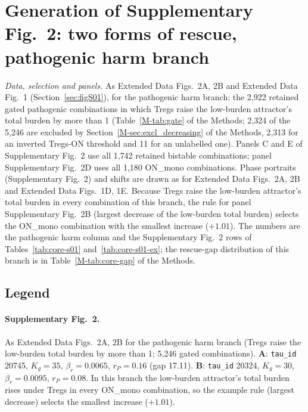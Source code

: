 \documentclass[11pt]{article}
\begin{document}
\section{Generation of Supplementary Fig.~2: two forms of rescue, pathogenic harm branch}
\label{sec:figS06}

\emph{Data, selection and panels.} As Extended Data Figs.~2A, 2B and Extended Data Fig.~1
(Section~\ref{sec:figS01}), for the pathogenic harm branch: the 2{,}922 retained gated pathogenic
combinations in which Tregs raise the low-burden attractor's total burden by more than 1
(Table~\ref{M-tab:gate} of the Methods; 2{,}324 of the 5{,}246 are excluded by
Section~\ref{M-sec:excl_decreasing} of the Methods, 2{,}313 for an inverted Tregs-ON threshold
and 11 for an unlabelled one). Panels C and E of Supplementary Fig.~2 use all 1{,}742 retained bistable
combinations; panel Supplementary Fig.~2D uses all 1{,}180 ON\_mono combinations. Phase portraits (Supplementary Fig.~2) and shifts are drawn as for
Extended Data Figs.~2A, 2B and Extended Data Figs.~1D, 1E. Because Tregs raise the low-burden attractor's total burden in every
combination of this branch, the rule for panel Supplementary Fig.~2B (largest decrease of the low-burden
total burden) selects the ON\_mono combination with the smallest increase ($+1.01$). The
numbers are the pathogenic harm column and the Supplementary Fig.~2 rows of Tables~\ref{tab:core-s01}
and~\ref{tab:core-s01-ex}; the rescue-gap distribution of this branch is in
Table~\ref{M-tab:core-gap} of the Methods.

\subsection{Legend}

\paragraph{Supplementary Fig.~2.}
As Extended Data Figs.~2A, 2B for the pathogenic harm branch (Tregs raise the low-burden
total burden by more than 1; 5,246 gated combinations). \textbf{A}: \texttt{tau\_id} 20745,
$K_g = 35$, $\beta_r = 0.0065$, $r_P = 0.16$ (gap 17.11).
\textbf{B}: \texttt{tau\_id} 20324, $K_g = 30$,
$\beta_r = 0.0095$, $r_P = 0.08$. In this branch the low-burden attractor's total burden rises
under Tregs in every ON\_mono combination, so the example rule (largest decrease) selects
the smallest increase ($+1.01$).
\end{document}
